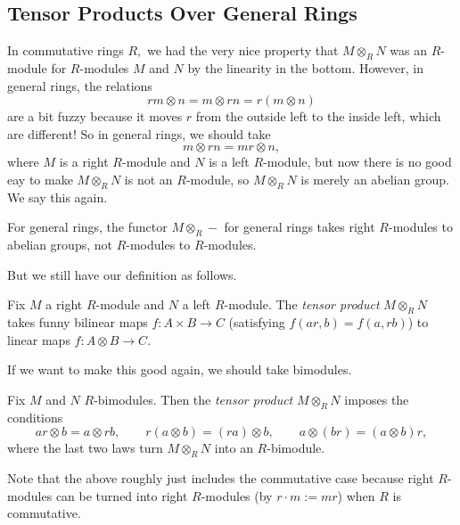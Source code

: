 \subsection{Tensor Products Over General Rings}
In commutative rings $R,$ we had the very nice property that $M\otimes_RN$ was an $R$-module for $R$-modules $M$ and $N$ by the linearity in the bottom. However, in general rings, the relations
\[rm\otimes n=m\otimes rn=r(m\otimes n)\]
are a bit fuzzy because it moves $r$ from the outside left to the inside left, which are different! So in general rings, we should take
\[m\otimes rn=mr\otimes n,\]
where $M$ is a right $R$-module and $N$ is a left $R$-module, but now there is no good eay to make $M\otimes_RN$ is not an $R$-module, so $M\otimes_RN$ is merely an abelian group. We say this again.
\begin{warn}
	For general rings, the functor $M\otimes_R-$ for general rings takes right $R$-modules to abelian groups, not $R$-modules to $R$-modules.
\end{warn}
But we still have our definition as follows.
\begin{definition}
	Fix $M$ a right $R$-module and $N$ a left $R$-module. The \textit{tensor product} $M\otimes_RN$ takes funny bilinear maps $f:A\times B\to C$ (satisfying $f(ar,b)=f(a,rb)$) to linear maps $f:A\otimes B\to C.$
\end{definition}
If we want to make this good again, we should take bimodules.
\begin{definition}
	Fix $M$ and $N$ $R$-bimodules. Then the \textit{tensor product} $M\otimes_RN$ imposes the conditions
	\[ar\otimes b=a\otimes rb,\qquad r(a\otimes b)=(ra)\otimes b,\qquad a\otimes(br)=(a\otimes b)r,\]
	where the last two laws turn $M\otimes_RN$ into an $R$-bimodule.
\end{definition}
Note that the above roughly just includes the commutative case because right $R$-modules can be turned into right $R$-modules (by $r\cdot m:=mr$) when $R$ is commutative.

